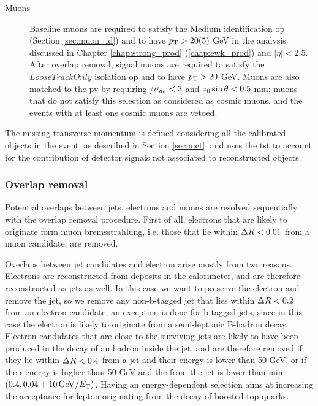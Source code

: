 \begin{description}
\item[Muons] Baseline muons are required to satisfy the Medium identification \gls{op} (Section \ref{sec:muon_id}) and to have $p_{\rm T} > 20 (5)$ GeV in the analysis discussed in Chapter \ref{chap:strong_prod} (\ref{chap:ewk_prod}) and $|\eta|<2.5$. 
After overlap removal, signal muons are required to satisfy the $LooseTrackOnly$ isolation \gls{op} and to have $p_{\rm T} > 20$ GeV.
Muons are also matched to the \gls{pv} by requiring \dzero/$\sigma_{d_0} < 3$ and  ${z_0} \sin\theta < 0.5$ mm; muons that do not satisfy this selection as considered as cosmic muons, and the events with at least one cosmic muons are vetoed.

\end{description}

The missing transverse momentum is defined considering all the calibrated objects in the event, as described in Section \ref{sec:met}, and uses the \gls{tst} to account for the contribution of
detector signals not associated to reconstructed objects. 

\subsubsection*{Overlap removal}

Potential overlaps between jets, electrons and muons are resolved sequentially with the overlap removal procedure. 
First of all, electrons that are likely to originate form muon bremsstrahlung, i.e. those that lie within $\Delta R < 0.01$ from a muon candidate, are removed.

Overlaps between jet candidates and electron arise mostly from two reasons. Electrons are reconstructed from deposits in the calorimeter, and are therefore reconstructed as jets as well.
In this case we want to preserve the electron and remove the jet, so we remove any non-b-tagged jet that lies within $\Delta R < 0.2$ from an electron candidate;
an exception is done for b-tagged jets, since in this case the electron is likely to originate from a semi-leptonic B-hadron decay. 
Electron candidates that are close to the surviving jets are likely to have been produced in the decay of an hadron inside the jet, and are therefore removed
if they lie within $\Delta R<0.4$ from a jet and their energy is lower than 50 GeV, or if their energy is higher than 50 GeV and the \dR from the jet 
is lower than min$(0.4, 0.04 + 10 \, {\rm{GeV}}/E_{\rm{T}})$. 
Having an energy-dependent \dR selection aims at increasing the acceptance for lepton originating from the decay of boosted top quarks.

